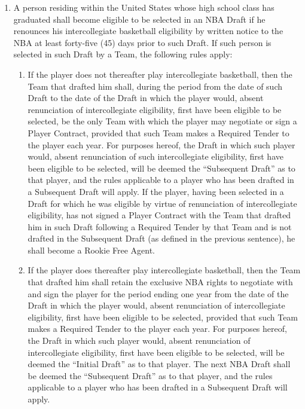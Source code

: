\documentclass[
]{book}
\providecommand{\tightlist}{%
  \setlength{\itemsep}{0pt}\setlength{\parskip}{0pt}}
\begin{document}
\begin{enumerate}
\def\labelenumi{(\alph{enumi})}
\tightlist
\item
  A person residing within the United States whose high school class has graduated shall become eligible to be selected in an NBA Draft if he renounces his intercollegiate basketball eligibility by written notice to the NBA at least forty-five (45) days prior to such Draft. If such person is selected in such Draft by a Team, the following rules apply:

  \begin{enumerate}
  \def\labelenumii{(\roman{enumii})}
  \tightlist
  \item
    If the player does not thereafter play intercollegiate basketball, then the Team that drafted him shall, during the period from the date of such Draft to the date of the Draft in which the player would, absent renunciation of intercollegiate eligibility, first have been eligible to be selected, be the only Team with which the player may negotiate or sign a Player Contract, provided that such Team makes a Required Tender to the player each year. For purposes hereof, the Draft in which such player would, absent renunciation of such intercollegiate eligibility, first have been eligible to be selected, will be deemed the ``Subsequent Draft'' as to that player, and the rules applicable to a player who has been drafted in a Subsequent Draft will apply. If the player, having been selected in a Draft for which he was eligible by virtue of renunciation of intercollegiate eligibility, has not signed a Player Contract with the Team that drafted him in such Draft following a Required Tender by that Team and is not drafted in the Subsequent Draft (as defined in the previous sentence), he shall become a Rookie Free Agent.
  \item
    If the player does thereafter play intercollegiate basketball, then the Team that drafted him shall retain the exclusive NBA rights to negotiate with and sign the player for the period ending one year from the date of the Draft in which the player would, absent renunciation of intercollegiate eligibility, first have been eligible to be selected, provided that such Team makes a Required Tender to the player each year. For purposes hereof, the Draft in which such player would, absent renunciation of intercollegiate eligibility, first have been eligible to be selected, will be deemed the ``Initial Draft'' as to that player. The next NBA Draft shall be deemed the ``Subsequent Draft'' as to that player, and the rules applicable to a player who has been drafted in a Subsequent Draft will apply.

\end{enumerate}
\end{enumerate}
\end{document}
